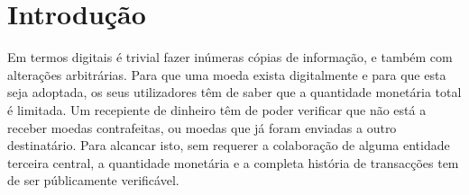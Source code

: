 \chapter{Introdução}
\label{chapter:introduction}

Em termos digitais é trivial fazer inúmeras cópias de informação, e também com alterações arbitrárias. Para que uma moeda exista digitalmente e para que esta seja adoptada, os seus utilizadores têm de saber que a quantidade monetária total é limitada. Um recepiente de dinheiro têm de poder verificar que não está a receber moedas contrafeitas, ou moedas que já foram enviadas a outro destinatário. Para alcancar isto, sem requerer a colaboração de alguma entidade terceira central, a quantidade monetária e a completa história de transacções tem de ser públicamente verificável. 
    




